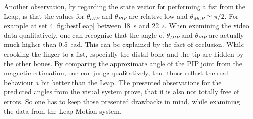 Another observation, by regarding the state vector for performing a fist from the Leap, is that the values for $ \theta_{DIP} $ and $ \theta_{PIP} $ are relative low and $ \theta_{MCP} \simeq \pi/2 $. For example at set 4 \ref{fig:bestLeap} between \SI{18}{\second} and \SI{22}{\second}. When examining the video data qualitatively, one can recognize that the angle of $ \theta_{DIP} $ and $ \theta_{PIP} $ are actually much higher than \SI{0.5}{\radian}. This can be explained by the fact of occlusion. While crooking the finger to a fist, especially the distal bone and the tip are hidden by the other bones. By comparing the approximate angle of the \ac{PIP} joint from the magnetic estimation, one can judge qualitatively, that those reflect the real behaviour a bit better than the Leap. The presented observations for the predicted angles from the visual system prove, that it is also not totally free of errors. So one has to keep those presented drawbacks in mind, while examining the data from the Leap Motion system.

